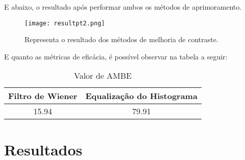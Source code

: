 \documentclass[conference]{IEEEtran}
\begin{document}
E abaixo, o resultado após performar ambos os métodos de aprimoramento.

\begin{figure}[H]
    \centering
    \texttt{[image: resultpt2.png]}
    \caption{Representa o resultado dos métodos de melhoria de contraste.}
    \label{fig:label2}
\end{figure}

E quanto as métricas de eficácia, é possível observar na tabela a seguir:

\begin{table}[H]
\renewcommand{\arraystretch}{1.3}
\caption{Valor de AMBE}
\label{table_example}
\centering
\begin{tabular}{c||c}
\hline
\bfseries Filtro de Wiener &
\bfseries Equalização do Histograma \\
\hline\hline
15.94 & 79.91 \\
\hline
\end{tabular}
\end{table}

\section{Resultados}
\end{document}
